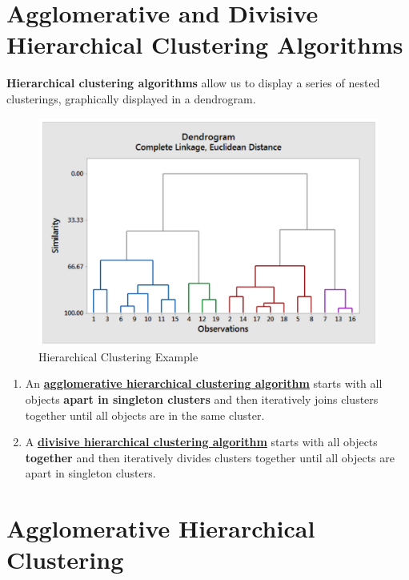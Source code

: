 \documentclass[11pt]{elegantbook}
\begin{document}
\section{Agglomerative and Divisive Hierarchical Clustering Algorithms}
\textbf{Hierarchical clustering algorithms} allow us to display a series of nested clusterings, graphically displayed in a dendrogram.
\begin{center}\begin{figure}[htbp]
    \centering
    \includegraphics[scale=0.2]{Hierarchical Clustering.png}
    \caption{Hierarchical Clustering Example}
    \label{}
\end{figure}\end{center}

\begin{enumerate}
    \item An \textbf{\underline{ agglomerative hierarchical clustering algorithm}} starts with all objects \textbf{apart in singleton clusters} and then iteratively joins clusters together until all objects
    are in the same cluster.
    \item A \textbf{\underline{ divisive hierarchical clustering algorithm}} starts with all objects \textbf{together} and then iteratively divides clusters together until all objects
    are apart
    in singleton clusters.
\end{enumerate}

\section{Agglomerative Hierarchical Clustering}
\end{document}
